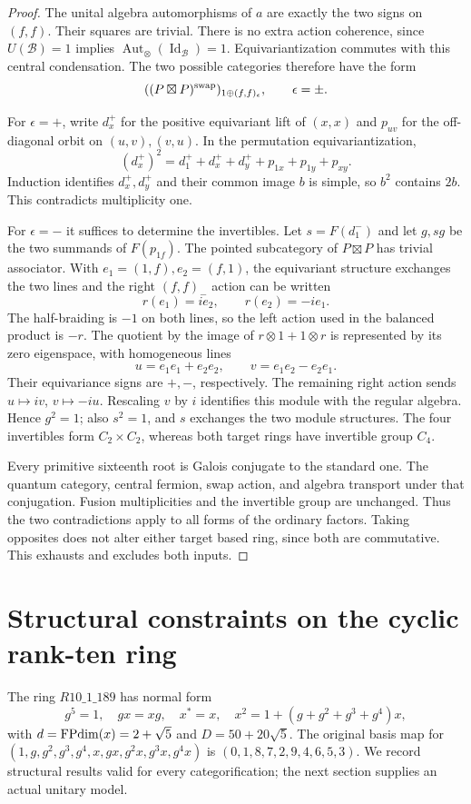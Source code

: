 \begin{proof}
The unital algebra automorphisms of $a$ are exactly the two signs on
$(f,f)$. Their squares are trivial. There is no extra action coherence,
since $U(\mathcal B)=1$ implies
$\operatorname{Aut}_{\otimes}(\operatorname{Id}_{\mathcal B})=1$.
Equivariantization commutes with this central condensation. The two
possible categories therefore have the form
\[
 ((P\boxtimes P)^{\rm swap})_{1\oplus(f,f)_{\epsilon}},
 \qquad\epsilon=\pm.
\]

For $\epsilon=+$, write $d_x^+$ for the positive equivariant lift of
$(x,x)$ and $p_{uv}$ for the off-diagonal orbit on $(u,v),(v,u)$.
In the permutation equivariantization,
\[
 (d_x^+)^2=d_1^++d_x^++d_y^++p_{1x}+p_{1y}+p_{xy}.
\]
Induction identifies $d_x^+,d_y^+$ and their common image $b$ is
simple, so $b^2$ contains $2b$. This contradicts multiplicity one.

For $\epsilon=-$ it suffices to determine the invertibles. Let
$s=F(d_1^-)$ and let $g,sg$ be the two summands of $F(p_{1f})$.
The pointed subcategory of $P\boxtimes P$ has trivial associator.
With $e_1=(1,f),e_2=(f,1)$, the equivariant structure exchanges the
two lines and the right $(f,f)_-$ action can be written
\[
 r(e_1)=ie_2,\qquad r(e_2)=-ie_1.
\]
The half-braiding is $-1$ on both lines, so the left action used in
the balanced product is $-r$. The quotient by the image of
$r\otimes1+1\otimes r$ is represented by its zero eigenspace, with
homogeneous lines
\[
 u=e_1e_1+e_2e_2,\qquad v=e_1e_2-e_2e_1.
\]
Their equivariance signs are $+,-$, respectively. The remaining right
action sends $u\mapsto iv$, $v\mapsto-iu$. Rescaling $v$ by $i$
identifies this module with the regular algebra. Hence $g^2=1$;
also $s^2=1$, and $s$ exchanges the two module structures. The four
invertibles form $C_2\times C_2$, whereas both target rings have
invertible group $C_4$.

Every primitive sixteenth root is Galois conjugate to the standard one.
The quantum category, central fermion, swap action, and algebra transport
under that conjugation. Fusion multiplicities and the invertible group
are unchanged. Thus the two contradictions apply to all forms of the
ordinary factors. Taking opposites does not alter either target based
ring, since both are commutative. This exhausts and excludes both inputs.
\end{proof}

\section{Structural constraints on the cyclic rank-ten ring}
\label{sec:cyclic-frontier}
The ring $R10\_1\_189$ has normal form
\begin{equation}\label{eq:cyclic-rank10}
 g^5=1,\quad gx=xg,\quad x^*=x,\quad
 x^2=1+(g+g^2+g^3+g^4)x,
\end{equation}
with $d=\operatorname{FPdim}(x)=2+\sqrt5$ and $D=50+20\sqrt5$.
The original basis map for
$(1,g,g^2,g^3,g^4,x,gx,g^2x,g^3x,g^4x)$ is
$(0,1,8,7,2,9,4,6,5,3)$. We record structural results valid for every categorification; the next section supplies an actual unitary model.

